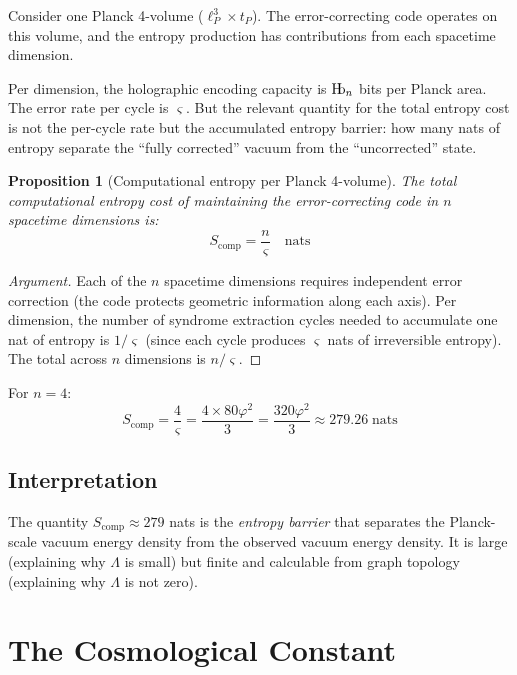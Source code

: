 \documentclass[11pt,a4paper]{article}
\newtheorem{proposition}[theorem]{Proposition}
\theoremstyle{definition}
\newcommand{\Hb}{\textnormal{H\kern-0.3em b}}
\newcommand{\Hbn}{\Hb_n}
\newcommand{\strain}{\varsigma}            %
\begin{document}
Consider one Planck 4-volume ($\ell_P^3 \times t_P$). The error-correcting code operates on this volume, and the entropy production has contributions from each spacetime dimension.

Per dimension, the holographic encoding capacity is $\Hbn$ bits per Planck area. The error rate per cycle is $\strain$. But the relevant quantity for the total entropy cost is not the per-cycle rate but the accumulated entropy barrier: how many nats of entropy separate the ``fully corrected'' vacuum from the ``uncorrected'' state.

\begin{proposition}[Computational entropy per Planck 4-volume]\label{prop:entropy}
The total computational entropy cost of maintaining the error-correcting code in $n$ spacetime dimensions is:
\begin{equation}\label{eq:Scomp}
    S_{\text{comp}} = \frac{n}{\strain} \quad \text{nats}
\end{equation}
\end{proposition}

\begin{proof}[Argument]
Each of the $n$ spacetime dimensions requires independent error correction (the code protects geometric information along each axis). Per dimension, the number of syndrome extraction cycles needed to accumulate one nat of entropy is $1/\strain$ (since each cycle produces $\strain$ nats of irreversible entropy). The total across $n$ dimensions is $n/\strain$.
\end{proof}

For $n = 4$:
\begin{equation}
    S_{\text{comp}} = \frac{4}{\strain} = \frac{4 \times 80\varphi^2}{3} 
    = \frac{320\varphi^2}{3} \approx 279.26 \;\text{nats}
\end{equation}

\subsection{Interpretation}

The quantity $S_{\text{comp}} \approx 279$ nats is the \emph{entropy barrier} that separates the Planck-scale vacuum energy density from the observed vacuum energy density. It is large (explaining why $\Lambda$ is small) but finite and calculable from graph topology (explaining why $\Lambda$ is not zero).


\section{The Cosmological Constant}
\end{document}
